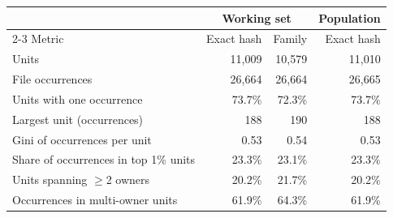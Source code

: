\begin{tabular}{lrrr}
\toprule
 & \multicolumn{2}{c}{Working set} & Population \\
\cmidrule(lr){2-3}
Metric & Exact hash & Family & Exact hash \\
\midrule
Units & 11,009 & 10,579 & 11,010 \\
File occurrences & 26,664 & 26,664 & 26,665 \\
Units with one occurrence & 73.7\% & 72.3\% & 73.7\% \\
Largest unit (occurrences) & 188 & 190 & 188 \\
Gini of occurrences per unit & 0.53 & 0.54 & 0.53 \\
Share of occurrences in top 1\% units & 23.3\% & 23.1\% & 23.3\% \\
Units spanning $\geq$2 owners & 20.2\% & 21.7\% & 20.2\% \\
Occurrences in multi-owner units & 61.9\% & 64.3\% & 61.9\% \\
\bottomrule
\end{tabular}
